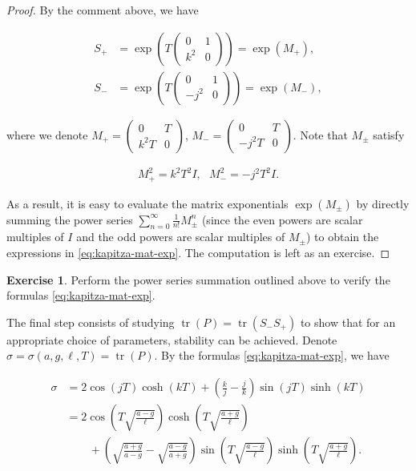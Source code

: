 \documentclass[11pt]{report}
\theoremstyle{plain}
\theoremstyle{definition}
\newtheorem{xexercise}[thm]{Exercise}
\begin{document}
\begin{proof}
By the comment above, we have

\begin{align*}
S_+ &= \exp\left(T \left(\begin{array}{cc} 0 & 1 \\ k^2 & 0
\end{array} \right) \right) = \exp(M_+), \\
S_- &= \exp\left(T \left(\begin{array}{cc} 0 & 1 \\ -j^2 & 0
\end{array} \right) \right) = \exp(M_-),
\end{align*}

\noindent where we denote
$M_+ = \left(\begin{array}{cc} 0 & T \\ k^2T & 0
\end{array}\right)$,
$M_- = \left(\begin{array}{cc} 0 & T \\ -j^2 T & 0
\end{array}\right)$.
Note that $M_\pm$ satisfy

\begin{align*}
M_+^2 = k^2 T^2 I, \ \ \
M_-^2 = -j^2 T^2 I.
\end{align*}

\noindent As a result, it is easy to evaluate the matrix
exponentials $\exp(M_\pm)$ by directly summing the
power series $\sum_{n=0}^\infty \frac{1}{n!}M_{\pm}^n$
(since the even powers are scalar multiples of $I$ and
the odd powers are scalar multiples of $M_\pm$) to
obtain the expressions in \eqref{eq:kapitza-mat-exp}. The
computation is left as an exercise.
\end{proof}

\begin{xexercise}
Perform the power series summation outlined above to
verify the formulas \eqref{eq:kapitza-mat-exp}.
\end{xexercise}

\noindent The final step consists of studying
$\operatorname{tr}(P)=\operatorname{tr}(S_- S_+)$ to
show that for an appropriate choice of parameters,
stability can be achieved. Denote
$\sigma = \sigma(a, g, \ell, T) =
\operatorname{tr}(P)$.
By the formulas \eqref{eq:kapitza-mat-exp}, we have

\begin{align*}
\sigma &=
2\cos\left(jT\right)\cosh\left(kT\right)
+ \left(\frac{k}{j}-\frac{j}{k}\right)
\sin\left(jT\right)\sinh\left(kT\right) \\
&=
2\cos\left(T\sqrt{\frac{a-g}{\ell}}\right)
\cosh\left(T\sqrt{\frac{a+g}{\ell}}\right) \\
& \qquad +
\left(\sqrt{\frac{a+g}{a-g}}-\sqrt{\frac{a-g}{a+g}}
\right)
\sin\left(T\sqrt{\frac{a-g}{\ell}}\right)
\sinh\left(T\sqrt{\frac{a+g}{\ell}}\right).
\end{align*}
\end{document}
